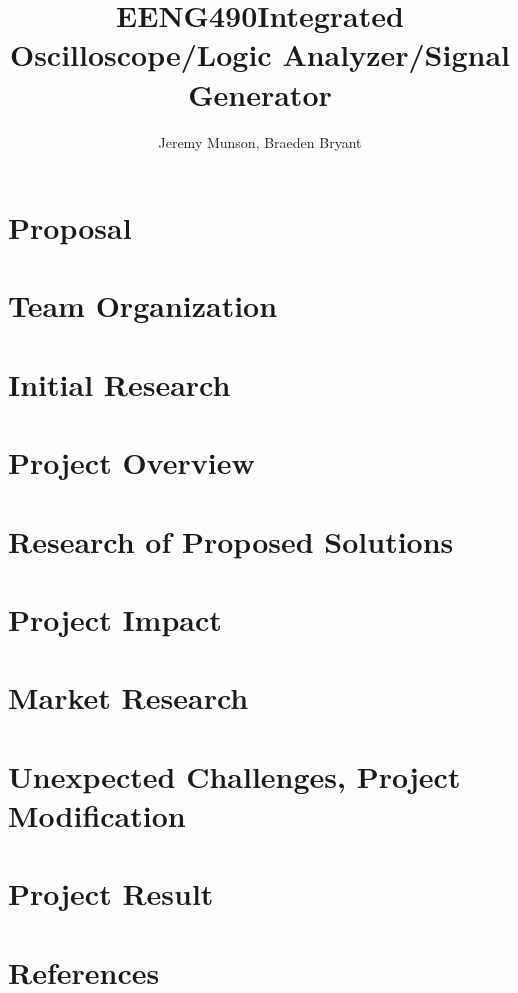 \documentclass[11pt]{article}
\title{EENG490\linebreak \linebreak Integrated Oscilloscope/Logic Analyzer/Signal Generator}
\author{Jeremy Munson, Braeden Bryant}
\begin{document}
	
	
	
	

	\section{Proposal}
	
	
	
	
	
	
	

	\section{Team Organization}
	
	

	\section{Initial Research}
	
	

	\section{Project Overview}
	
	
	
	
	

	\section{Research of Proposed Solutions}
	
	
	
	
	
	
	
	
	
	\section{Project Impact}
	
	
	\section{Market Research}
	
	
	\section{Unexpected Challenges, Project Modification}
	
	
	\section{Project Result}
	
	
	\section{References}
	
\end{document}
